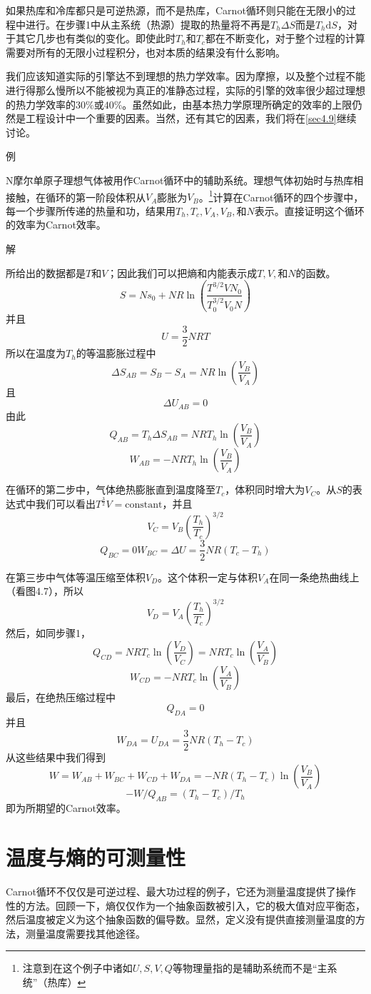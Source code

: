 如果热库和冷库都只是可逆热源，而不是热库，Carnot循环则只能在无限小的过程中进行。在步骤1中从主系统（热源）提取的热量将不再是$T_h\Delta S$而是$T_h\text{d}S$，对于其它几步也有类似的变化。即使此时$T_h$和$T_c$都在不断变化，对于整个过程的计算需要对所有的无限小过程积分，也对本质的结果没有什么影响。

我们应该知道实际的引擎达不到理想的热力学效率。因为摩擦，以及整个过程不能进行得那么慢所以不能被视为真正的准静态过程，实际的引擎的效率很少超过理想的热力学效率的$30\%$或$40\%$。虽然如此，由基本热力学原理所确定的效率的上限仍然是工程设计中一个重要的因素。当然，还有其它的因素，我们将在\ref{sec4.9}继续讨论。

例

N摩尔单原子理想气体被用作Carnot循环中的辅助系统。理想气体初始时与热库相接触，在循环的第一阶段体积从$V_A$膨胀为$V_B$。\footnote{注意到在这个例子中诸如$U,S,V,Q$等物理量指的是辅助系统而不是“主系统”（热库）}计算在Carnot循环的四个步骤中，每一个步骤所传递的热量和功，结果用$T_h,T_c,V_A,V_B,$和$N$表示。直接证明这个循环的效率为Carnot效率。

解

\noindent 所给出的数据都是$T$和$V$；因此我们可以把熵和内能表示成$T,V,$和$N$的函数。
\[S = Ns_0 + NR\ln(\frac{T^{3/2}VN_0}{T_0^{3/2}V_0N})\]
并且
\[U = \frac{3}{2}NRT\]
所以在温度为$T_h$的等温膨胀过程中
\[\Delta S_{AB} = S_B - S_A = NR\ln(\frac{V_B}{V_A})\]
且
\[\Delta U_{AB} = 0\]
由此
\[Q_{AB} = T_h\Delta S_{AB} = NRT_h\ln(\frac{V_B}{V_A})\]
\[W_{AB} = -NRT_h\ln(\frac{V_B}{V_A})\]

在循环的第二步中，气体绝热膨胀直到温度降至$T_c$，体积同时增大为$V_C$。从$S$的表达式中我们可以看出$T^{\frac{3}{2}}V = \text{constant}$，并且
\[V_C = V_B(\frac{T_h}{T_c})^{3/2}\]
\[Q_{BC}=0  W_{BC}=\Delta U = \frac{3}{2}NR(T_c - T_h)\]

在第三步中气体等温压缩至体积$V_D$。这个体积一定与体积$V_A$在同一条绝热曲线上（看图4.7），所以
\[V_D = V_A(\frac{T_h}{T_c})^{3/2}\]
然后，如同步骤1，
\[Q_{CD} = NRT_c\ln(\frac{V_D}{V_C}) = NRT_c\ln(\frac{V_A}{V_B})\]
\[W_{CD} = -NRT_c\ln(\frac{V_A}{V_B})\]
最后，在绝热压缩过程中
\[Q_{DA} = 0\]
并且
\[W_{DA} = U_{DA} = \frac{3}{2}NR(T_h - T_c)\]
从这些结果中我们得到
\[W = W_{AB} + W_{BC} + W_{CD} + W_{DA} = -NR(T_h - T_c)\ln(\frac{V_B}{V_A})\]
\[-W/Q_{AB} = (T_h - T_c)/T_h\]
即为所期望的Carnot效率。

\section{温度与熵的可测量性}
\label{sec4.8}
Carnot循环不仅仅是可逆过程、最大功过程的例子，它还为测量温度提供了操作性的方法。回顾一下，熵仅仅作为一个抽象函数被引入，它的极大值对应平衡态，然后温度被定义为这个抽象函数的偏导数。显然，定义没有提供直接测量温度的方法，测量温度需要找其他途径。

